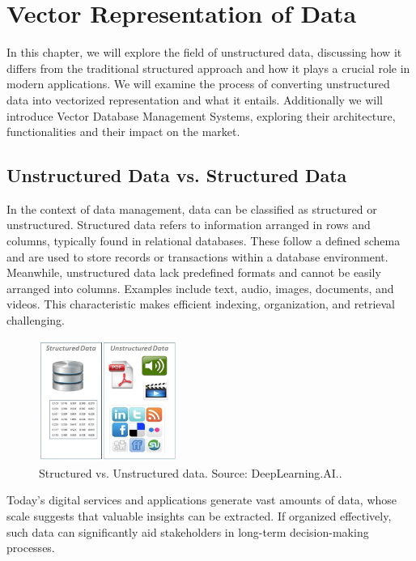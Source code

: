 \pagestyle{fancy}
\chapter{Vector Representation of Data}
\label{chap:first_chapter}

In this chapter, we will explore the field of unstructured data, discussing how it differs from the traditional structured approach and how it plays a crucial role in modern applications. We will examine the process of converting unstructured data into vectorized representation and what it entails. Additionally we will introduce Vector Database Management Systems, exploring their architecture, functionalities and their impact on the market.

\section{Unstructured Data vs. Structured Data}
In the context of data management, data can be classified as structured or unstructured. Structured data refers to information arranged in rows and columns, typically found in relational databases. These follow a defined schema and are used to store records or transactions within a database environment. Meanwhile, unstructured data lack predefined formats and cannot be easily arranged into columns. Examples include text, audio, images, documents, and videos. This characteristic makes efficient indexing, organization, and retrieval challenging.
\begin{figure}[h]
    \centering
    \includegraphics[width=0.4\textwidth]{IMAGES/immagine_2025-02-24_091828425.png}
    \caption{Structured vs. Unstructured data. Source: DeepLearning.AI.\footnotemark.}
    \label{fig:structuredVunstruct}
\end{figure}

Today’s digital services and applications generate vast amounts of data, whose scale suggests that valuable insights can be extracted. If organized effectively, such data can significantly aid stakeholders in long-term decision-making processes.

